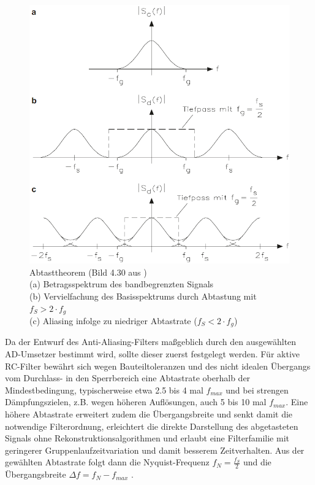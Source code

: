 \documentclass[a4paper, portrait, 12pt]{scrartcl} %
\begin{document}
\begin{figure}[H]
	\centering
		\includegraphics[scale=0.5]{aaf_freq_domain_bernstein.png} 
		\caption{\centering Abtasttheorem (Bild 4.30 aus \cite[S. 314]{Bernstein2023})\\
			\footnotesize(a) Betragsspektrum des bandbegrenzten Signals\\
			(b) Vervielfachung des Basisspektrums durch Abtastung mit $f_S > 2\cdot f_g$\\
			(c) Aliasing infolge zu niedriger Abtastrate ($f_S < 2\cdot f_g$)
		}
	\label{fig:aaf_freq_domain}
\end{figure}

Da der Entwurf des Anti-Aliasing-Filters maßgeblich durch den ausgewählten AD-Umsetzer bestimmt wird, sollte dieser zuerst festgelegt werden. Für aktive RC-Filter bewährt sich wegen Bauteiltoleranzen und des nicht idealen Übergangs vom Durchlass- in den Sperrbereich eine Abtastrate oberhalb der Mindestbedingung, typischerweise etwa 2.5 bis 4 mal $f_{max}$ und bei strengen Dämpfungszielen, z.B. wegen höheren Auflösungen, auch 5 bis 10 mal $f_{max}$. Eine höhere Abtastrate erweitert zudem die Übergangsbreite und senkt damit die notwendige Filterordnung, erleichtert die direkte Darstellung des abgetasteten Signals ohne Rekonstruktionsalgorithmen und erlaubt eine Filterfamilie mit geringerer Gruppenlaufzeitvariation und damit besserem Zeitverhalten. Aus der gewählten Abtastrate folgt dann die Nyquist-Frequenz $f_N = \frac{f_S}{2}$ und die Übergangsbreite $\Delta f = f_N - f_{max}$ \cite{Pini2020}.\\
\end{document}
